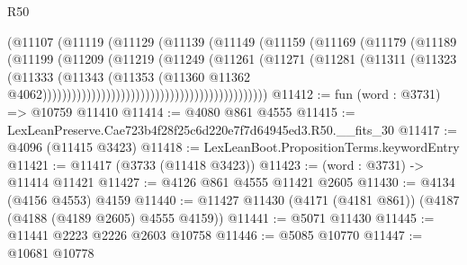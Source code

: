 \begin{lexlean}{R50}
\begin{coremodule}
                                                    (@11107
                                                      (@11119
                                                        (@11129
                                                          (@11139
                                                            (@11149
                                                              (@11159
                                                                (@11169
                                                                  (@11179
                                                                    (@11189
                                                                      (@11199
                                                                        (@11209
                                                                          (@11219
                                                                            (@11249
                                                                              (@11261
                                                                                (@11271
                                                                                  (@11281
                                                                                    (@11311
                                                                                      (@11323
                                                                                        (@11333
                                                                                          (@11343
                                                                                            (@11353
                                                                                              (@11360
                                                                                                @11362
                                                                                                @4062))))))))))))))))))))))))))))))))))))))))))))))
@11412 := fun (word : @3731) => @10759 @11410
@11414 := @4080 @861 @4555
@11415 := LexLeanPreserve.Cae723b4f28f25c6d220e7f7d64945ed3.R50.__fits_30
@11417 := @4096 (@11415 @3423)
@11418 := LexLeanBoot.PropositionTerms.keywordEntry
@11421 := @11417 (@3733 (@11418 @3423))
@11423 := (word : @3731) -> @11414 @11421
@11427 := @4126 @861 @4555 @11421 @2605
@11430 := @4134 (@4156 @4553) @4159
@11440 := @11427 @11430 (@4171 (@4181 @861)) (@4187 (@4188 (@4189 @2605) @4555 @4159))
@11441 := @5071 @11430
@11445 := @11441 @2223 @2226 @2603 @10758
@11446 := @5085 @10770
@11447 := @10681 @10778

\end{coremodule}
\end{lexlean}
